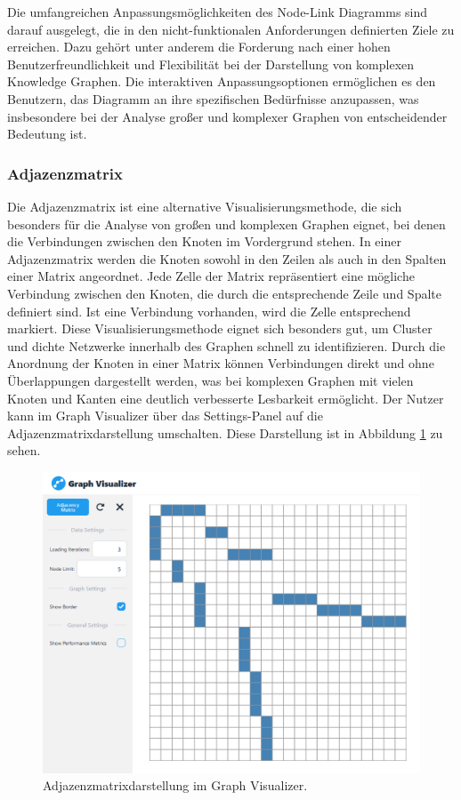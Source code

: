 Die umfangreichen Anpassungsmöglichkeiten des Node-Link Diagramms sind darauf ausgelegt, die in den nicht-funktionalen Anforderungen definierten Ziele zu erreichen. Dazu gehört unter anderem die Forderung nach einer hohen Benutzerfreundlichkeit und Flexibilität bei der Darstellung von komplexen Knowledge Graphen. Die interaktiven Anpassungsoptionen ermöglichen es den Benutzern, das Diagramm an ihre spezifischen Bedürfnisse anzupassen, was insbesondere bei der Analyse großer und komplexer Graphen von entscheidender Bedeutung ist.

\subsubsection{Adjazenzmatrix}

Die Adjazenzmatrix ist eine alternative Visualisierungsmethode, die sich besonders für die Analyse von großen und komplexen Graphen eignet, bei denen die Verbindungen zwischen den Knoten im Vordergrund stehen. In einer Adjazenzmatrix werden die Knoten sowohl in den Zeilen als auch in den Spalten einer Matrix angeordnet. Jede Zelle der Matrix repräsentiert eine mögliche Verbindung zwischen den Knoten, die durch die entsprechende Zeile und Spalte definiert sind. Ist eine Verbindung vorhanden, wird die Zelle entsprechend markiert. Diese Visualisierungsmethode eignet sich besonders gut, um Cluster und dichte Netzwerke innerhalb des Graphen schnell zu identifizieren. Durch die Anordnung der Knoten in einer Matrix können Verbindungen direkt und ohne Überlappungen dargestellt werden, was bei komplexen Graphen mit vielen Knoten und Kanten eine deutlich verbesserte Lesbarkeit ermöglicht. Der Nutzer kann im Graph Visualizer über das Settings-Panel auf die Adjazenzmatrixdarstellung umschalten. Diese Darstellung ist in Abbildung \ref{fig:realization:implementation:AdjacencyMatrixView} zu sehen.

\begin{figure}[h]
    \centering
    \includegraphics[height=.5\textwidth]{images/03/AdjacencyViewWithSettings.png}
    \caption{Adjazenzmatrixdarstellung im Graph Visualizer.}
    \label{fig:realization:implementation:AdjacencyMatrixView}
\end{figure}

